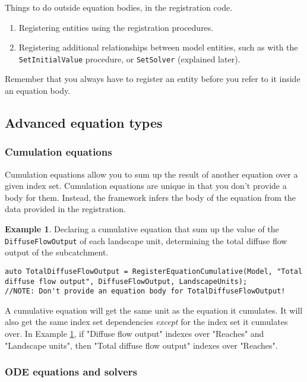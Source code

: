 \documentclass[11pt]{article}
\theoremstyle{definition}
\newtheorem{myexample}{Example}
\newenvironment{example}%
  {\begin{lrbox}{\examplebox}%
   \begin{minipage}{\dimexpr\linewidth-2\fboxsep}
   \begin{myexample}}%
  {\end{myexample}%
   \end{minipage}%
   \end{lrbox}%
   \begin{trivlist}
     \item[]\colorbox{silver}{\usebox\examplebox}
   \end{trivlist}}
\begin{document}
Things to do outside equation bodies, in the registration code.
\begin{enumerate}[i]
\item Registering entities using the registration procedures.
\item Registering additional relationships between model entities, such as with the {\tt SetInitialValue} procedure, or {\tt SetSolver} (explained later).
\end{enumerate}

Remember that you always have to register an entity before you refer to it inside an equation body.

\subsection{Advanced equation types}

\subsubsection{Cumulation equations}

Cumulation equations allow you to sum up the result of another equation over a given index set. Cumulation equations are unique in that you don't provide a body for them. Instead, the framework infers the body of the equation from the data provided in the registration.

\begin{example}\label{ex:cumulation}
Declaring a cumulative equation that sum up the value of the {\tt DiffuseFlowOutput} of each landscape unit, determining the total diffuse flow output of the subcatchment.
\begin{lstlisting}[style=mycpp]
auto TotalDiffuseFlowOutput = RegisterEquationCumulative(Model, "Total diffuse flow output", DiffuseFlowOutput, LandscapeUnits);
//NOTE: Don't provide an equation body for TotalDiffuseFlowOutput!
\end{lstlisting}
\end{example}

A cumulative equation will get the same unit as the equation it cumulates. It will also get the same index set dependencies \emph{except} for the index set it cumulates over. In Example \ref{ex:cumulation}, if "Diffuse flow output" indexes over "Reaches" and "Landscape units", then "Total diffuse flow output" indexes over "Reaches".

\subsubsection{ODE equations and solvers}
\end{document}
